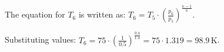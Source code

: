 The equation for \( T_6 \) is written as:  
\( T_6 = T_5 \cdot \left( \frac{p_6}{p_5} \right)^{\frac{\kappa - 1}{\kappa}} \).  

Substituting values:  
\( T_6 = 75 \cdot \left( \frac{1}{0.5} \right)^{\frac{0.4}{1.4}} = 75 \cdot 1.319 = 98.9 \, \text{K} \).